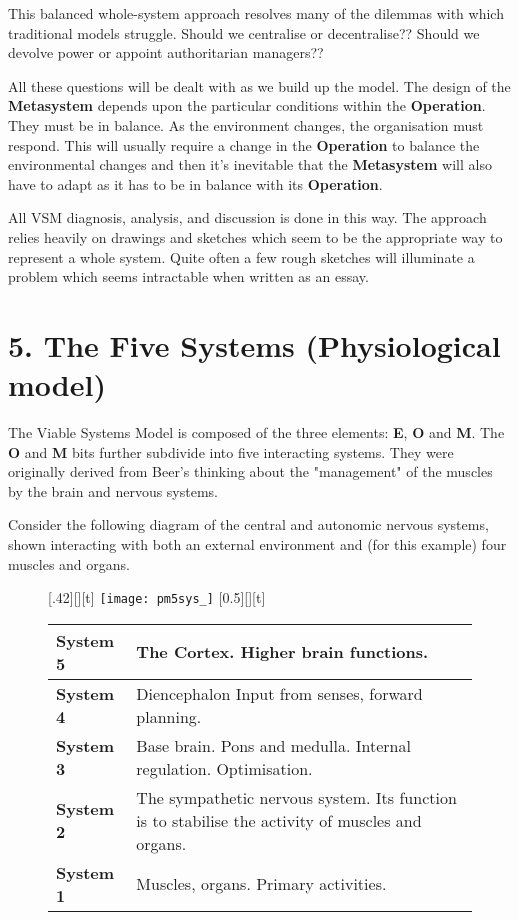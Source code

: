 This balanced whole-system approach resolves many of the dilemmas with which traditional models struggle. Should we centralise or decentralise?? Should we devolve power or appoint authoritarian managers??

All these questions will be dealt with as we build up the model. The design of the \textcolor{M}{\textbf{Metasystem}} depends upon the particular conditions within the \textcolor{O}{\textbf{Operation}}. They must be in balance. As the environment changes, the organisation must respond. This will usually require a change in the \textcolor{O}{\textbf{Operation}} to balance the environmental changes and then it's inevitable that the \textcolor{M}{\textbf{Metasystem}} will also have to adapt as it has to be in balance with its \textcolor{O}{\textbf{Operation}}.

All VSM diagnosis, analysis, and discussion is done in this way. The approach relies heavily on drawings and sketches which seem to be the appropriate way to represent a whole system. Quite often a few rough sketches will illuminate a problem which seems intractable when written as an essay.

\section*{5. The Five Systems (Physiological model)}
The Viable Systems Model is composed of the three elements: \textcolor{E}{\textbf{E}}, \textcolor{O}{\textbf{O}} and \textcolor{M}{\textbf{M}}. The \textcolor{O}{\textbf{O}} and \textcolor{M}{\textbf{M}} bits further subdivide into five interacting systems. They were originally derived from Beer's thinking about the "management" of the muscles by the brain and nervous systems.

Consider the following diagram of the central and autonomic nervous systems, shown interacting with both an external environment and (for this example) four muscles and organs.
\begin{figure}[H]
\begin{floatrow}
    [.42\textwidth][\FBheight][t]{}{
    \texttt{[image: pm5sys\_]}
}
    [0.5\textwidth][\FBheight][t]{}{
    \begin{tabular}{ | m{} | p{} | }
        \hline
        \textbf{System 5} & The Cortex. Higher brain functions. \\
        \hline
        \textbf{System 4} & Diencephalon Input from senses, forward planning. \\
        \hline
        \textbf{System 3} & Base brain. Pons and medulla. Internal regulation. \mbox{Optimisation}. \\
        \hline
        \textbf{System 2} & The sympathetic nervous system. Its function is to \mbox{stabilise} the activity of muscles and organs. \\
        \hline
        \textbf{System 1} & Muscles, organs. Primary activities. \\
        \hline
    \end{tabular}
}
\end{floatrow}
\end{figure}

